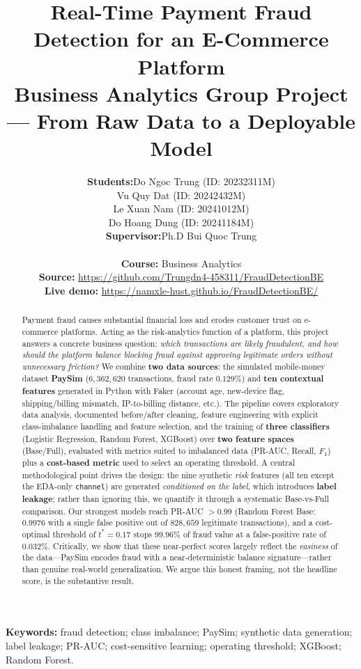 \documentclass{article}
\title{Real-Time Payment Fraud Detection for an E-Commerce Platform\\[0.3em]
\large Business Analytics Group Project --- From Raw Data to a Deployable Model}
\author{%
  \begin{tabular}{@{}ll@{}}
    \textbf{Students:} & Do Ngoc Trung \quad(ID: 20232311M) \\
                       & Vu Quy Dat \quad(ID: 20242432M) \\
                       & Le Xuan Nam \quad(ID: 20241012M) \\
                       & Do Hoang Dung \quad(ID: 20241184M) \\[0.4em]
    \textbf{Supervisor:} & Ph.D Bui Quoc Trung \\
  \end{tabular} \\[0.6em]
  \textbf{Course:} Business Analytics \\[0.3em]
  \textbf{Source:} \url{https://github.com/Trungdn4-458311/FraudDetectionBE} \\[0.3em]
  \textbf{Live demo:} \url{https://namxle-hust.github.io/FraudDetectionBE/}%
}
\date{}
\begin{document}
\maketitle
\sloppy

\begin{abstract}
Payment fraud causes substantial financial loss and erodes customer
trust on e-commerce platforms. Acting as the risk-analytics function of
a platform, this project answers a concrete business question:
\emph{which transactions are likely fraudulent, and how should the
platform balance blocking fraud against approving legitimate orders
without unnecessary friction?} We combine \textbf{two data sources}: the
simulated mobile-money dataset \textbf{PaySim} ($6{,}362{,}620$
transactions, fraud rate $0.129\%$) and \textbf{ten contextual
features} generated in Python with Faker (account age, new-device flag,
shipping/billing mismatch, IP-to-billing distance, etc.). The pipeline
covers exploratory data analysis, documented before/after cleaning,
feature engineering with explicit class-imbalance handling and feature
selection, and the training of \textbf{three classifiers} (Logistic
Regression, Random Forest, XGBoost) over \textbf{two feature spaces}
(Base/Full), evaluated with metrics suited to imbalanced data (PR-AUC,
Recall, $F_1$) plus a \textbf{cost-based metric} used to select an
operating threshold. A central methodological point drives the design:
the nine synthetic \emph{risk} features (all ten except the EDA-only
\texttt{channel}) are generated \emph{conditioned on the label}, which
introduces \textbf{label leakage}; rather than ignoring
this, we quantify it through a systematic Base-vs-Full comparison. Our
strongest models reach PR-AUC $>0.99$ (Random Forest Base: $0.9976$
with a single false positive out of $828{,}659$ legitimate
transactions), and a cost-optimal threshold of $t^{*}=0.17$ stops
$99.96\%$ of fraud value at a false-positive rate of $0.032\%$.
Critically, we show that these near-perfect scores largely reflect the
\emph{easiness} of the data---PaySim encodes fraud with a
near-deterministic balance signature---rather than genuine real-world
generalization. We argue this honest framing, not the headline score,
is the substantive result.
\end{abstract}

\noindent\textbf{Keywords:} fraud detection; class imbalance; PaySim;
synthetic data generation; label leakage; PR-AUC; cost-sensitive
learning; operating threshold; XGBoost; Random Forest.
\end{document}
